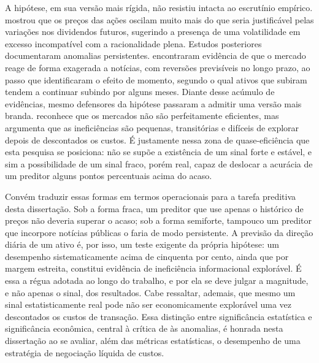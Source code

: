 A hipótese, em sua versão mais rígida, não resistiu intacta ao escrutínio empírico.  mostrou que os preços das ações oscilam muito mais do que seria justificável pelas variações nos dividendos futuros, sugerindo a presença de uma volatilidade em excesso incompatível com a racionalidade plena. Estudos posteriores documentaram anomalias persistentes.  encontraram evidência de que o mercado reage de forma exagerada a notícias, com reversões previsíveis no longo prazo, ao passo que  identificaram o efeito de momento, segundo o qual ativos que subiram tendem a continuar subindo por alguns meses. Diante desse acúmulo de evidências, mesmo defensores da hipótese passaram a admitir uma versão mais branda.  reconhece que os mercados não são perfeitamente eficientes, mas argumenta que as ineficiências são pequenas, transitórias e difíceis de explorar depois de descontados os custos. É justamente nessa zona de quase-eficiência que esta pesquisa se posiciona: não se supõe a existência de um sinal forte e estável, e sim a possibilidade de um sinal fraco, porém real, capaz de deslocar a acurácia de um preditor alguns pontos percentuais acima do acaso.

Convém traduzir essas formas em termos operacionais para a tarefa preditiva desta dissertação. Sob a forma fraca, um preditor que use apenas o histórico de preços não deveria superar o acaso; sob a forma semiforte, tampouco um preditor que incorpore notícias públicas o faria de modo persistente. A previsão da direção diária de um ativo é, por isso, um teste exigente da própria hipótese: um desempenho sistematicamente acima de cinquenta por cento, ainda que por margem estreita, constitui evidência de ineficiência informacional explorável. É essa a régua adotada ao longo do trabalho, e por ela se deve julgar a magnitude, e não apenas o sinal, dos resultados. Cabe ressaltar, ademais, que mesmo um sinal estatisticamente real pode não ser economicamente explorável uma vez descontados os custos de transação. Essa distinção entre significância estatística e significância econômica, central à crítica de  às anomalias, é honrada nesta dissertação ao se avaliar, além das métricas estatísticas, o desempenho de uma estratégia de negociação líquida de custos.

